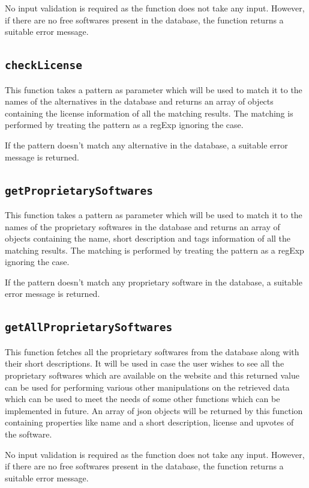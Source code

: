 No input validation is required as the function does not take any input. However, if there are no free softwares present in the database, the function returns a suitable error message.


\subsection{\texttt{checkLicense}}
This function takes a pattern as parameter which will be used to match it to the names of the alternatives in the database and returns an array of objects containing the license information of all the matching results. The matching is performed by treating the pattern as a regExp ignoring the case.

If the pattern doesn’t match any alternative in the database, a suitable error message is returned. 

\subsection{\texttt{getProprietarySoftwares}}
This function takes a pattern as parameter which will be used to match it to the names of the proprietary softwares in the database and returns an array of objects containing the name, short description and tags information of all the matching results. The matching is performed by treating the pattern as a regExp ignoring the case.

If the pattern doesn’t match any proprietary software in the database, a suitable error message is returned. 


\subsection{\texttt{getAllProprietarySoftwares}}
This function fetches all the proprietary softwares from the database along with their short descriptions. It will be used in case the user wishes to see all the proprietary softwares which are available on the website and this returned value can be used for performing various other manipulations on the retrieved data which can be used to meet the needs of some other functions which can be implemented in future.
An array of json objects will be returned by this function containing properties like name and a short description, license and upvotes of the software. 

No input validation is required as the function does not take any input. However, if there are no free softwares present in the database, the function returns a suitable error message.


